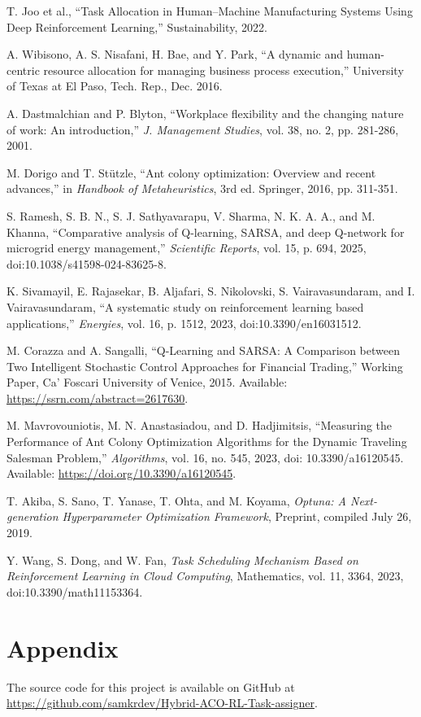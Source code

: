\documentclass[%
aip,
cp,  %
reprint
]{revtex4-2}
\begin{document}
\begin{thebibliography}{99}
		 T. Joo et al., ``Task Allocation in Human–Machine Manufacturing
		Systems Using Deep Reinforcement Learning,'' Sustainability, 2022.
		
		 A. Wibisono, A. S. Nisafani, H. Bae, and Y. Park, ``A dynamic
		and human-centric resource allocation for managing business process execution,''
		University of Texas at El Paso, Tech. Rep., Dec. 2016.
		
		 A. Dastmalchian and P. Blyton, ``Workplace flexibility
		and the changing nature of work: An introduction,'' \textit{J. Management Studies},
		vol. 38, no. 2, pp. 281-286, 2001.
		
		 M. Dorigo and T. Stützle, ``Ant colony optimization:
		Overview and recent advances,'' in \textit{Handbook of Metaheuristics}, 3rd
		ed. Springer, 2016, pp. 311-351.
		
		 S. Ramesh, S. B. N., S. J. Sathyavarapu, V. Sharma, N. K. A. A., and M. Khanna, ``Comparative analysis of Q-learning, SARSA, and deep Q-network for microgrid energy management,'' \textit{Scientific Reports}, vol. 15, p. 694, 2025, doi:10.1038/s41598-024-83625-8.
		
		 K. Sivamayil, E. Rajasekar, B. Aljafari, S. Nikolovski, S. Vairavasundaram, and I. Vairavasundaram, ``A systematic study on reinforcement learning based applications,'' \textit{Energies}, vol. 16, p. 1512, 2023, doi:10.3390/en16031512.
		
		M. Corazza and A. Sangalli, ``Q-Learning and SARSA: A Comparison between Two Intelligent Stochastic Control Approaches for Financial Trading,'' Working Paper, Ca’ Foscari University of Venice, 2015. Available: \url{https://ssrn.com/abstract=2617630}.
		
		M. Mavrovouniotis, M. N. Anastasiadou, and D. Hadjimitsis, ``Measuring the Performance of Ant Colony Optimization Algorithms for the Dynamic Traveling Salesman Problem,'' \textit{Algorithms}, vol. 16, no. 545, 2023, doi: 10.3390/a16120545. Available: \url{https://doi.org/10.3390/a16120545}.
		
		T. Akiba, S. Sano, T. Yanase, T. Ohta, and M. Koyama, \emph{Optuna: A Next-generation Hyperparameter Optimization Framework}, Preprint, compiled July 26, 2019.
		
		
		Y. Wang, S. Dong, and W. Fan, \emph{Task Scheduling Mechanism Based on Reinforcement Learning in Cloud Computing}, Mathematics, vol. 11, 3364, 2023, doi:10.3390/math11153364.
		
	\end{thebibliography}
	
	\section{\label{sec:appendix}Appendix}
	The source code for this project is available on GitHub at \url{https://github.com/samkrdev/Hybrid-ACO-RL-Task-assigner}.
	
	
	
\end{document}
